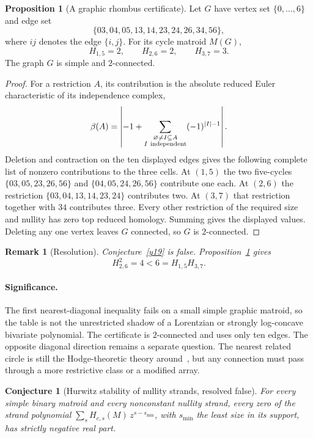 \documentclass[11pt]{article}
\newtheorem{conjecture}{Conjecture}
\newtheorem{remark}{Remark}
\theoremstyle{definition}
\newtheorem{proposition}{Proposition}
\begin{document}
\begin{proposition}[A graphic rhombus certificate]\label{y:rhombus}
Let $G$ have vertex set $\{0,\ldots,6\}$ and edge set
\[
\{03,04,05,13,14,23,24,26,34,56\},
\]
where $ij$ denotes the edge $\{i,j\}$.  For its cycle matroid $M(G)$,
\[
H_{1,5}=2,\qquad H_{2,6}=2,\qquad H_{3,7}=3.
\]
The graph $G$ is simple and $2$-connected.
\end{proposition}

\begin{proof}
For a restriction $A$, its contribution is the absolute reduced Euler characteristic of its independence complex,
\[
\beta(A)=\left|-1+\sum_{\substack{\varnothing\ne I\subseteq A\\I\ {\rm independent}}}(-1)^{|I|-1}\right|.
\]
Deletion and contraction on the ten displayed edges gives the following complete list of nonzero contributions to the three cells.  At $(1,5)$ the two five-cycles $\{03,05,23,26,56\}$ and $\{04,05,24,26,56\}$ contribute one each.  At $(2,6)$ the restriction $\{03,04,13,14,23,24\}$ contributes two.  At $(3,7)$ that restriction together with $34$ contributes three.  Every other restriction of the required size and nullity has zero top reduced homology.  Summing gives the displayed values.  Deleting any one vertex leaves $G$ connected, so $G$ is $2$-connected.
\end{proof}

\begin{remark}[Resolution]\label{y19:res}
Conjecture~\ref{y19} is false.  Proposition~\ref{y:rhombus} gives
\[
H_{2,6}^2=4<6=H_{1,5}H_{3,7}.
\]
\end{remark}

\paragraph{Significance.}
The first nearest-diagonal inequality fails on a small simple graphic matroid, so the table is not the unrestricted shadow of a Lorentzian or strongly log-concave bivariate polynomial.  The certificate is $2$-connected and uses only ten edges.  The opposite diagonal direction remains a separate question.  The nearest related circle is still the Hodge-theoretic theory around~\cite{AHK18}, but any connection must pass through a more restrictive class or a modified array.

\begin{conjecture}[Hurwitz stability of nullity strands, resolved false]\label{y20}
For every simple binary matroid and every nonconstant nullity strand, every zero of the strand polynomial $\sum_sH_{c,s}(M)\,z^{s-s_{\min}}$, with $s_{\min}$ the least size in its support, has strictly negative real part.
\end{conjecture}
\end{document}
